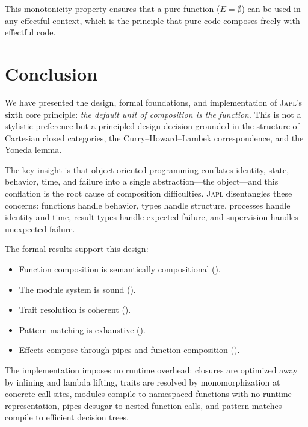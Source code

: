 \documentclass[11pt,a4paper]{article}
\newcommand{\japl}{\textsc{Japl}}
\begin{document}
This monotonicity property ensures that a pure function ($E = \emptyset$) can be used in any effectful context, which is the principle that pure code composes freely with effectful code.


\section{Conclusion}
\label{sec:conclusion}

We have presented the design, formal foundations, and implementation of \japl{}'s sixth core principle: \emph{the default unit of composition is the function}. This is not a stylistic preference but a principled design decision grounded in the structure of Cartesian closed categories, the Curry--Howard--Lambek correspondence, and the Yoneda lemma.

The key insight is that object-oriented programming conflates identity, state, behavior, time, and failure into a single abstraction---the object---and this conflation is the root cause of composition difficulties. \japl{} disentangles these concerns: functions handle behavior, types handle structure, processes handle identity and time, result types handle expected failure, and supervision handles unexpected failure.

The formal results support this design:
\begin{itemize}
  \item Function composition is semantically compositional ().
  \item The module system is sound ().
  \item Trait resolution is coherent ().
  \item Pattern matching is exhaustive ().
  \item Effects compose through pipes and function composition ().
\end{itemize}

The implementation imposes no runtime overhead: closures are optimized away by inlining and lambda lifting, traits are resolved by monomorphization at concrete call sites, modules compile to namespaced functions with no runtime representation, pipes desugar to nested function calls, and pattern matches compile to efficient decision trees.
\end{document}
